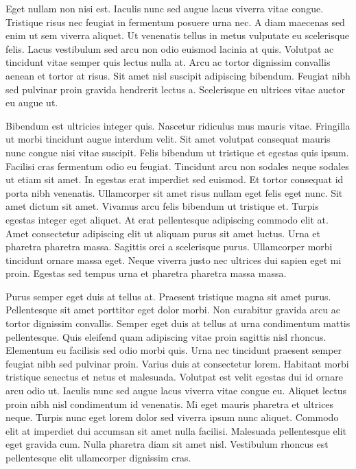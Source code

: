 \documentclass[12pt, oneside, a4paper]{article}
\begin{document}
Eget nullam non nisi est. Iaculis nunc sed augue lacus viverra vitae congue. Tristique risus nec feugiat in fermentum posuere urna nec. A diam maecenas sed enim ut sem viverra aliquet. Ut venenatis tellus in metus vulputate eu scelerisque felis. Lacus vestibulum sed arcu non odio euismod lacinia at quis. Volutpat ac tincidunt vitae semper quis lectus nulla at. Arcu ac tortor dignissim convallis aenean et tortor at risus. Sit amet nisl suscipit adipiscing bibendum. Feugiat nibh sed pulvinar proin gravida hendrerit lectus a. Scelerisque eu ultrices vitae auctor eu augue ut.

Bibendum est ultricies integer quis. Nascetur ridiculus mus mauris vitae. Fringilla ut morbi tincidunt augue interdum velit. Sit amet volutpat consequat mauris nunc congue nisi vitae suscipit. Felis bibendum ut tristique et egestas quis ipsum. Facilisi cras fermentum odio eu feugiat. Tincidunt arcu non sodales neque sodales ut etiam sit amet. In egestas erat imperdiet sed euismod. Et tortor consequat id porta nibh venenatis. Ullamcorper sit amet risus nullam eget felis eget nunc. Sit amet dictum sit amet. Vivamus arcu felis bibendum ut tristique et. Turpis egestas integer eget aliquet. At erat pellentesque adipiscing commodo elit at. Amet consectetur adipiscing elit ut aliquam purus sit amet luctus. Urna et pharetra pharetra massa. Sagittis orci a scelerisque purus. Ullamcorper morbi tincidunt ornare massa eget. Neque viverra justo nec ultrices dui sapien eget mi proin. Egestas sed tempus urna et pharetra pharetra massa massa.

Purus semper eget duis at tellus at. Praesent tristique magna sit amet purus. Pellentesque sit amet porttitor eget dolor morbi. Non curabitur gravida arcu ac tortor dignissim convallis. Semper eget duis at tellus at urna condimentum mattis pellentesque. Quis eleifend quam adipiscing vitae proin sagittis nisl rhoncus. Elementum eu facilisis sed odio morbi quis. Urna nec tincidunt praesent semper feugiat nibh sed pulvinar proin. Varius duis at consectetur lorem. Habitant morbi tristique senectus et netus et malesuada. Volutpat est velit egestas dui id ornare arcu odio ut. Iaculis nunc sed augue lacus viverra vitae congue eu. Aliquet lectus proin nibh nisl condimentum id venenatis. Mi eget mauris pharetra et ultrices neque. Turpis nunc eget lorem dolor sed viverra ipsum nunc aliquet. Commodo elit at imperdiet dui accumsan sit amet nulla facilisi. Malesuada pellentesque elit eget gravida cum. Nulla pharetra diam sit amet nisl. Vestibulum rhoncus est pellentesque elit ullamcorper dignissim cras.
\end{document}
